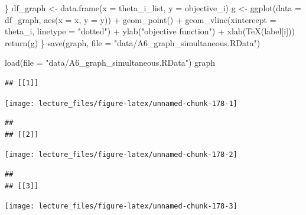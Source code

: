 \documentclass[
]{book}
\newenvironment{Shaded}{\begin{snugshade}}{\end{snugshade}}
\newcommand{\AttributeTok}[1]{\textcolor[rgb]{0.77,0.63,0.00}{#1}}
\newcommand{\FunctionTok}[1]{\textcolor[rgb]{0.00,0.00,0.00}{#1}}
\newcommand{\NormalTok}[1]{#1}
\newcommand{\OtherTok}[1]{\textcolor[rgb]{0.56,0.35,0.01}{#1}}
\newcommand{\SpecialCharTok}[1]{\textcolor[rgb]{0.00,0.00,0.00}{#1}}
\newcommand{\StringTok}[1]{\textcolor[rgb]{0.31,0.60,0.02}{#1}}
\begin{document}
\begin{Shaded}
\begin{Highlighting}[]
\NormalTok{             \}}
\NormalTok{  df\_graph }\OtherTok{\textless{}{-}} \FunctionTok{data.frame}\NormalTok{(}\AttributeTok{x =}\NormalTok{ theta\_i\_list, }\AttributeTok{y =}\NormalTok{ objective\_i) }
\NormalTok{  g }\OtherTok{\textless{}{-}} \FunctionTok{ggplot}\NormalTok{(}\AttributeTok{data =}\NormalTok{ df\_graph, }\FunctionTok{aes}\NormalTok{(}\AttributeTok{x =}\NormalTok{ x, }\AttributeTok{y =}\NormalTok{ y)) }\SpecialCharTok{+} 
    \FunctionTok{geom\_point}\NormalTok{() }\SpecialCharTok{+}
    \FunctionTok{geom\_vline}\NormalTok{(}\AttributeTok{xintercept =}\NormalTok{ theta\_i, }\AttributeTok{linetype =} \StringTok{"dotted"}\NormalTok{) }\SpecialCharTok{+}
    \FunctionTok{ylab}\NormalTok{(}\StringTok{"objective function"}\NormalTok{) }\SpecialCharTok{+} \FunctionTok{xlab}\NormalTok{(}\FunctionTok{TeX}\NormalTok{(label[i]))}
  \FunctionTok{return}\NormalTok{(g)}
\NormalTok{\}}
\FunctionTok{save}\NormalTok{(graph, }\AttributeTok{file =} \StringTok{"data/A6\_graph\_simultaneous.RData"}\NormalTok{)}
\end{Highlighting}
\end{Shaded}

\begin{Shaded}
\begin{Highlighting}[]
\FunctionTok{load}\NormalTok{(}\AttributeTok{file =} \StringTok{"data/A6\_graph\_simultaneous.RData"}\NormalTok{)}
\NormalTok{graph}
\end{Highlighting}
\end{Shaded}

\begin{verbatim}
## [[1]]
\end{verbatim}

\begin{center}\texttt{[image: lecture\_files/figure-latex/unnamed-chunk-178-1]} \end{center}

\begin{verbatim}
## 
## [[2]]
\end{verbatim}

\begin{center}\texttt{[image: lecture\_files/figure-latex/unnamed-chunk-178-2]} \end{center}

\begin{verbatim}
## 
## [[3]]
\end{verbatim}

\begin{center}\texttt{[image: lecture\_files/figure-latex/unnamed-chunk-178-3]} \end{center}
\end{document}

